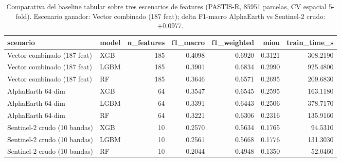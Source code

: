 \begin{table}
\caption{Comparativa del baseline tabular sobre tres escenarios de features (PASTIS-R, 85951 parcelas, CV espacial 5-fold). Escenario ganador: Vector combinado (187 feat); delta F1-macro AlphaEarth vs Sentinel-2 crudo: +0.0977.}
\label{tab:baseline-comparison}
\begin{tabular}{llrrrrr}
\toprule
scenario & model & n\_features & f1\_macro & f1\_weighted & miou & train\_time\_s \\
\midrule
Vector combinado (187 feat) & XGB & 185 & 0.4098 & 0.6920 & 0.3121 & 308.2190 \\
Vector combinado (187 feat) & LGBM & 185 & 0.3901 & 0.6834 & 0.2990 & 925.4800 \\
Vector combinado (187 feat) & RF & 185 & 0.3646 & 0.6571 & 0.2695 & 209.6830 \\
AlphaEarth 64-dim & XGB & 64 & 0.3547 & 0.6545 & 0.2595 & 163.1180 \\
AlphaEarth 64-dim & LGBM & 64 & 0.3391 & 0.6443 & 0.2506 & 378.7170 \\
AlphaEarth 64-dim & RF & 64 & 0.3221 & 0.6306 & 0.2316 & 135.9160 \\
Sentinel-2 crudo (10 bandas) & XGB & 10 & 0.2570 & 0.5634 & 0.1765 & 94.5310 \\
Sentinel-2 crudo (10 bandas) & LGBM & 10 & 0.2561 & 0.5668 & 0.1776 & 131.3030 \\
Sentinel-2 crudo (10 bandas) & RF & 10 & 0.2044 & 0.4948 & 0.1350 & 52.0460 \\
\bottomrule
\end{tabular}
\end{table}
